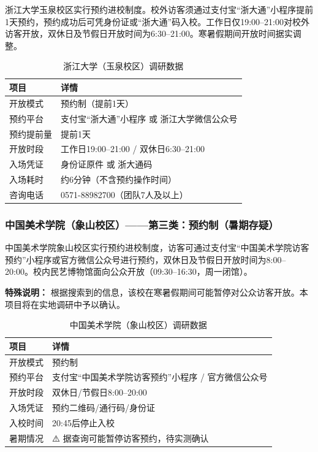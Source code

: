 \documentclass[12pt]{article}
\begin{document}
浙江大学玉泉校区实行预约进校制度。校外访客须通过支付宝“浙大通”小程序提前1天预约，预约成功后可凭身份证或“浙大通”码入校。工作日仅19:00–21:00对校外访客开放，双休日及节假日开放时间为6:30–21:00。寒暑假期间开放时间据实调整。

\begin{table}[H]
\centering
\caption{浙江大学（玉泉校区）调研数据}
\label{tab:zju}
\begin{tabular}{p{3cm}p{7.5cm}}
\toprule
\textbf{项目} & \textbf{详情} \\
\midrule
开放模式 & 预约制（提前1天） \\
预约平台 & 支付宝“浙大通”小程序 或 浙江大学微信公众号 \\
预约提前量 & 提前1天 \\
开放时段 & 工作日19:00–21:00 / 双休日6:30–21:00 \\
入场凭证 & 身份证原件 或 浙大通码 \\
入场耗时 & 约6分钟（不含预约操作时间） \\
咨询电话 & 0571-88982700（团队7人及以上） \\
\bottomrule
\end{tabular}
\end{table}

\subsubsection{中国美术学院（象山校区）——第三类：预约制（暑期存疑）}

中国美术学院象山校区实行预约进校制度，访客可通过支付宝“中国美术学院访客预约”小程序或官方微信公众号进行预约，双休日及节假日开放时间为8:00–20:00。校内民艺博物馆面向公众开放（09:30–16:30，周一闭馆）。

\textbf{特殊说明：} 根据搜索到的信息，该校在寒暑假期间可能暂停对公众访客开放。本项目将在实地调研中予以确认。

\begin{table}[H]
\centering
\caption{中国美术学院（象山校区）调研数据}
\label{tab:caa}
\begin{tabular}{p{3cm}p{7.5cm}}
\toprule
\textbf{项目} & \textbf{详情} \\
\midrule
开放模式 & 预约制 \\
预约平台 & 支付宝“中国美术学院访客预约”小程序 / 官方微信公众号 \\
开放时段 & 双休日/节假日8:00–20:00 \\
入场凭证 & 预约二维码/通行码/身份证 \\
入校时间 & 20:45后停止入校 \\
暑期情况 & ⚠️ 据查询可能暂停访客预约，待实测确认 \\
\bottomrule
\end{tabular}
\end{table}
\end{document}
